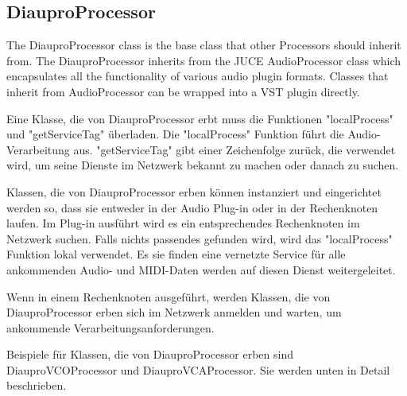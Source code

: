 \subsection{DiauproProcessor}

The DiauproProcessor class is the base class that other Processors should inherit from. The DiauproProcessor inherits from the JUCE AudioProcessor class which encapsulates all the functionality of various audio plugin formats. Classes that inherit from AudioProcessor can be wrapped into a VST plugin directly.

Eine Klasse, die von DiauproProcessor erbt muss die Funktionen "localProcess" und "getServiceTag" überladen. Die "localProcess" Funktion führt die Audio-Verarbeitung aus. "getServiceTag" gibt einer Zeichenfolge zurück, die verwendet wird, um seine Dienste im Netzwerk bekannt zu machen oder danach zu suchen.

Klassen, die von DiauproProcessor erben können instanziert und eingerichtet werden so, dass sie entweder in der Audio Plug-in oder in der Rechenknoten laufen. Im Plug-in ausführt wird es ein entsprechendes Rechenknoten im Netzwerk suchen. Falls nichts passendes gefunden wird, wird das "localProcess" Funktion lokal verwendet. Es sie finden eine vernetzte Service für alle ankommenden Audio- und MIDI-Daten werden auf diesen Dienst weitergeleitet.

Wenn in einem Rechenknoten ausgeführt, werden Klassen, die von DiauproProcessor erben sich im Netzwerk anmelden und warten, um ankommende Verarbeitungsanforderungen.

Beispiele für Klassen, die von DiauproProcessor erben sind DiauproVCOProcessor und DiauproVCAProcessor. Sie werden unten in Detail beschrieben.